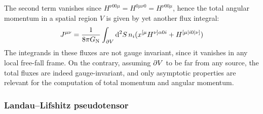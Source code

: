 The second term vanishes since $ H^{\nu 0 0 \mu} = H^{0 \mu \nu 0} = H^{\nu 0 0 \mu} $, hence the total angular momentum in a spatial region $ V $ is given by yet another flux integral:
\begin{equation*}
  J^{\mu \nu} = \frac{1}{8\pi G_\text{N}} \int_{\partial V} \mathrm{d}^2S \, n_i (x^{[\mu} H^{\nu] \alpha 0 i} + H^{[\mu | i 0 | \nu]})
\end{equation*}
The integrands in these fluxes are not gauge invariant, since it vanishes in any local free-fall frame. On the contrary, assuming $ \partial V $ to be far from any source, the total fluxes are indeed gauge-invariant, and only asymptotic properties are relevant for the computation of total momentum and angular momentum.

\subsubsection{Landau--Lifshitz pseudotensor}

